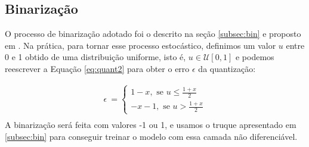 \subsection{Binarização}

O processo de binarização adotado foi o descrito na seção \ref{subsec:bin} e proposto em \cite{Variable2016Toderici}.
Na prática, para tornar esse processo estocástico,  definimos um valor $u$ entre 0 e 1 obtido de uma distribuição uniforme, isto é,  $u \in \mathcal{U}[0,1]$ e podemos reescrever a Equação \ref{eq:quant2}  para obter o erro $\epsilon$ da quantização:

\begin{equation}
\label{eq:quant}
\begin{aligned}
\epsilon \ = \left\{
\begin{array}{ll}
1 - x, \text{ se $u$}  \leq \frac{1 + x}{2} \\
-x - 1, \text{ se $u$} > \frac{1 + x}{2}
\end{array}
\right. \\
\end{aligned}
\end{equation}
A binarização será feita com valores -1 ou 1, e usamos o truque apresentado em \ref{subsec:bin} para conseguir treinar o modelo com essa camada não diferenciável. 











